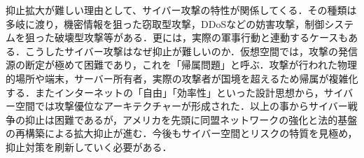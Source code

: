 \documentclass[uplatex,twocolumn,dvipdfmx]{jsarticle}
\begin{document}
抑止拡大が難しい理由として、サイバー攻撃の特性が関係してくる．その種類は多岐に渡り，機密情報を狙った窃取型攻撃，DDoSなどの妨害攻撃，制御システムを狙った破壊型攻撃等がある．更には，実際の軍事行動と連動するケースもある．こうしたサイバー攻撃はなぜ抑止が難しいのか．仮想空間では，攻撃の発信源の断定が極めて困難であり，これを「帰属問題」と呼ぶ．攻撃が行われた物理的場所や端末，サーバー所有者，実際の攻撃者が国境を超えるため帰属が複雑化する．またインターネットの「自由」「効率性」といった設計思想から，サイバー空間では攻撃優位なアーキテクチャーが形成された．以上の事からサイバー戦争の抑止は困難であるが，アメリカを先頭に同盟ネットワークの強化と法的基盤の再構築による拡大抑止が進む．今後もサイバー空間とリスクの特質を見極め，抑止対策を刷新していく必要がある．



\end{document}

